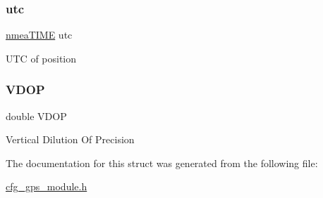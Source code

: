 \subsubsection{\texorpdfstring{utc}{utc}}
{\footnotesize\ttfamily \hyperlink{cfg__gps__module_8h_a02bf9ae5b3df2ced0b3406a214735cb2}{nmea\+T\+I\+ME} utc}

U\+TC of position \mbox{\label{struct__nmea_i_n_f_o_aa63791741ca31a6f80069a2e8a718dd4}} 
\subsubsection{\texorpdfstring{V\+D\+OP}{VDOP}}
{\footnotesize\ttfamily double V\+D\+OP}

Vertical Dilution Of Precision 

The documentation for this struct was generated from the following file\+:\begin{DoxyCompactItemize}
\item 
\hyperlink{cfg__gps__module_8h}{cfg\+\_\+gps\+\_\+module.\+h}\end{DoxyCompactItemize}
